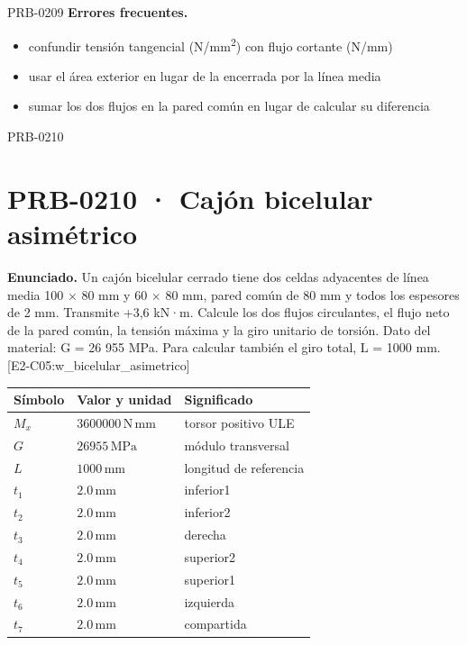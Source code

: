 \begin{studiumworked}{PRB-0209}
\textbf{Errores frecuentes.}\begin{itemize}\item confundir tensión tangencial (N/mm\textsuperscript{2}) con flujo cortante (N/mm)
\item usar el área exterior en lugar de la encerrada por la línea media
\item sumar los dos flujos en la pared común en lugar de calcular su diferencia\end{itemize}

\end{studiumworked}

\Needspace{.3\textheight}

\begin{studiumworked}{PRB-0210}

\section{PRB-0210 · Cajón bicelular asimétrico}

\textbf{Enunciado.} Un cajón bicelular cerrado tiene dos celdas adyacentes de línea media 100 \ensuremath{\times} 80 mm y 60 \ensuremath{\times} 80 mm, pared común de 80 mm y todos los espesores de 2 mm. Transmite +3,6 kN·m. Calcule los dos flujos circulantes, el flujo neto de la pared común, la tensión máxima y la giro unitario de torsión. Dato del material: G = 26 955 MPa. Para calcular también el giro total, L = 1000 mm. [E2-C05:w\_bicelular\_asimetrico]

\par\medskip\noindent\begin{tabular}{@{}p{.18\linewidth}p{.26\linewidth}p{.48\linewidth}@{}}
\toprule Símbolo & Valor y unidad & Significado\\\midrule
$M_{x}$ & $3600000\,\mathrm{N\,mm}$ & torsor positivo ULE\\
$G$ & $26955\,\mathrm{MPa}$ & módulo transversal\\
$L$ & $1000\,\mathrm{mm}$ & longitud de referencia\\
$t_{1}$ & $2.0\,\mathrm{mm}$ & inferior1\\
$t_{2}$ & $2.0\,\mathrm{mm}$ & inferior2\\
$t_{3}$ & $2.0\,\mathrm{mm}$ & derecha\\
$t_{4}$ & $2.0\,\mathrm{mm}$ & superior2\\
$t_{5}$ & $2.0\,\mathrm{mm}$ & superior1\\
$t_{6}$ & $2.0\,\mathrm{mm}$ & izquierda\\
$t_{7}$ & $2.0\,\mathrm{mm}$ & compartida\\
\bottomrule\end{tabular}\par\medskip


\end{studiumworked}
